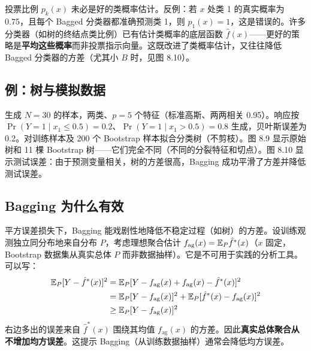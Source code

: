 \begin{remark}
    投票比例 $p_k(x)$ 未必是好的类概率估计。反例：若 $x$ 处类 1 的真实概率为 0.75，且每个 Bagged 分类器都准确预测类 1，则 $p_1(x) = 1$，这是错误的。许多分类器（如树的终结点类比例）已有估计类概率的底层函数 $\hat{f}(x)$——更好的策略是\textbf{平均这些概率}而非投票指示向量。这既改进了类概率估计，又往往降低 Bagged 分类器的方差（尤其小 $B$ 时，见图 8.10）。
\end{remark}

\subsection{例：树与模拟数据}

生成 $N = 30$ 的样本，两类、$p = 5$ 个特征（标准高斯、两两相关 0.95）。响应按 $\Pr(Y=1 \mid x_1 \le 0.5) = 0.2$、$\Pr(Y=1 \mid x_1 > 0.5) = 0.8$ 生成，贝叶斯误差为 0.2。对训练样本及 200 个 Bootstrap 样本拟合分类树（不剪枝）。图 8.9 显示原始树和 11 棵 Bootstrap 树——它们完全不同（不同的分裂特征和切点）。图 8.10 显示测试误差：由于预测变量相关，树的方差很高，Bagging 成功平滑了方差并降低测试误差。

\subsection{Bagging 为什么有效}

平方误差损失下，Bagging 能戏剧性地降低不稳定过程（如树）的方差。设训练观测独立同分布地来自分布 $P$，考虑理想聚合估计 $f_{\mathrm{ag}}(x) = \mathbb{E}_P\hat{f}^*(x)$（$x$ 固定，Bootstrap 数据集从真实总体 $P$ 而非数据抽样）。它是不可用于实践的分析工具。可以写：
\begin{equation}\label{eq:8_52}
    \begin{aligned}
        \mathbb{E}_P[Y - \hat{f}^*(x)]^2 &= \mathbb{E}_P[Y - f_{\mathrm{ag}}(x) + f_{\mathrm{ag}}(x) - \hat{f}^*(x)]^2 \\
        &= \mathbb{E}_P[Y - f_{\mathrm{ag}}(x)]^2 + \mathbb{E}_P[\hat{f}^*(x) - f_{\mathrm{ag}}(x)]^2 \\
        &\geq \mathbb{E}_P[Y - f_{\mathrm{ag}}(x)]^2
    \end{aligned}
\end{equation}
右边多出的误差来自 $\hat{f}^*(x)$ 围绕其均值 $f_{\mathrm{ag}}(x)$ 的方差。因此\textbf{真实总体聚合从不增加均方误差}。这提示 Bagging（从训练数据抽样）通常会降低均方误差。

